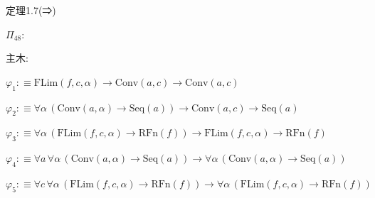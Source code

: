 \begin{fullproof}{定理1.7(⇒)}
\begin{ptree}
\end{ptree}
\noindent$\Pi_{48}$:
\begin{ptree}
\noLine
{}
\noLine
{}
\noLine
{}
\end{ptree}
\noindent 主木:
\begin{ptree}
\noLine
{}
\noLine
{}
\end{ptree}
\begin{abbrevlist}
\item $\varphi_{1} :\equiv \mathrm{FLim}(f,c,\alpha) \to \mathrm{Conv}(a,c) \to \mathrm{Conv}(a,c)$
\item $\varphi_{2} :\equiv \forall \alpha\,(\mathrm{Conv}(a,\alpha) \to \mathrm{Seq}(a)) \to \mathrm{Conv}(a,c) \to \mathrm{Seq}(a)$
\item $\varphi_{3} :\equiv \forall \alpha\,(\mathrm{FLim}(f,c,\alpha) \to \mathrm{RFn}(f)) \to \mathrm{FLim}(f,c,\alpha) \to \mathrm{RFn}(f)$
\item $\varphi_{4} :\equiv \forall a\,\forall \alpha\,(\mathrm{Conv}(a,\alpha) \to \mathrm{Seq}(a)) \to \forall \alpha\,(\mathrm{Conv}(a,\alpha) \to \mathrm{Seq}(a))$
\item $\varphi_{5} :\equiv \forall c\,\forall \alpha\,(\mathrm{FLim}(f,c,\alpha) \to \mathrm{RFn}(f)) \to \forall \alpha\,(\mathrm{FLim}(f,c,\alpha) \to \mathrm{RFn}(f))$

\end{abbrevlist}
\end{fullproof}
